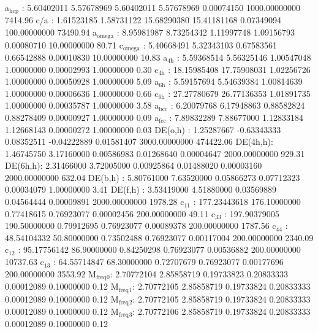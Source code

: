 \documentclass[11pt]{article}
\begin{document}
a\(_{\text{hcp}}\)   :   5.60402011   5.57678969   5.60402011   5.57678969   0.00074150 1000.00000000      7414.96
c/a     :   1.61523185   1.58731122  15.68290380  15.41181168   0.07349094 100.00000000     73490.94
a\(_{\text{omega}}\) :   8.95981987   8.73254342   1.11997748   1.09156793   0.00080710  10.00000000        80.71
c\(_{\text{omega}}\) :   5.40668491   5.32343103   0.67583561   0.66542888   0.00010830  10.00000000        10.83
a\(_{\text{4h}}\)    :   5.59368514   5.56325146   1.00547048   1.00000000   0.00002993   1.00000000         0.30
c\(_{\text{4h}}\)    :  18.15985408  17.75908031   1.02256726   1.00000000   0.00050928   1.00000000         5.09
a\(_{\text{6h}}\)    :   5.59157694   5.54639384   1.00814639   1.00000000   0.00006636   1.00000000         0.66
c\(_{\text{6h}}\)    :  27.27780679  26.77136353   1.01891735   1.00000000   0.00035787   1.00000000         3.58
a\(_{\text{bcc}}\)   :   6.20079768   6.17948863   0.88582824   0.88278409   0.00000927   1.00000000         0.09
a\(_{\text{fcc}}\)   :   7.89832289   7.88677000   1.12833184   1.12668143   0.00000272   1.00000000         0.03
DE(o,h) :   1.25287667  -0.63343333   0.08352511  -0.04222889   0.01581407 3000.00000000    474422.06
DE(4h,h):   1.46745750   3.17160000   0.00586983   0.01268640   0.00004647 2000.00000000       929.31
DE(6h,h):   2.31466000   3.72005000   0.00925864   0.01488020   0.00003160 2000.00000000       632.04
DE(b,h) :   5.80761000   7.63520000   0.05866273   0.07712323   0.00034079   1.00000000         3.41
DE(f,h) :   3.53419000   4.51880000   0.03569889   0.04564444   0.00009891 2000.00000000      1978.28
c\(_{\text{11}}\)    : 177.23443618 176.10000000   0.77418615   0.76923077   0.00002456 200.00000000        49.11
c\(_{\text{33}}\)    : 197.90379005 190.50000000   0.79912695   0.76923077   0.00089378 200.00000000      1787.56
c\(_{\text{44}}\)    :  48.54104332  50.80000000   0.73502488   0.76923077   0.00117004 200.00000000      2340.09
c\(_{\text{12}}\)    :  95.17756142  86.90000000   0.84250298   0.76923077   0.00536882 200.00000000     10737.63
c\(_{\text{13}}\)    :  64.55714847  68.30000000   0.72707679   0.76923077   0.00177696 200.00000000      3553.92
M\(_{\text{freq}}\)\(_{\text{0}}\):   2.70772104   2.85858719   0.19733823   0.20833333   0.00012089   0.10000000         0.12
M\(_{\text{freq}}\)\(_{\text{1}}\):   2.70772105   2.85858719   0.19733824   0.20833333   0.00012089   0.10000000         0.12
M\(_{\text{freq}}\)\(_{\text{2}}\):   2.70772105   2.85858719   0.19733824   0.20833333   0.00012089   0.10000000         0.12
M\(_{\text{freq}}\)\(_{\text{3}}\):   2.70772106   2.85858719   0.19733824   0.20833333   0.00012089   0.10000000         0.12
\end{document}
